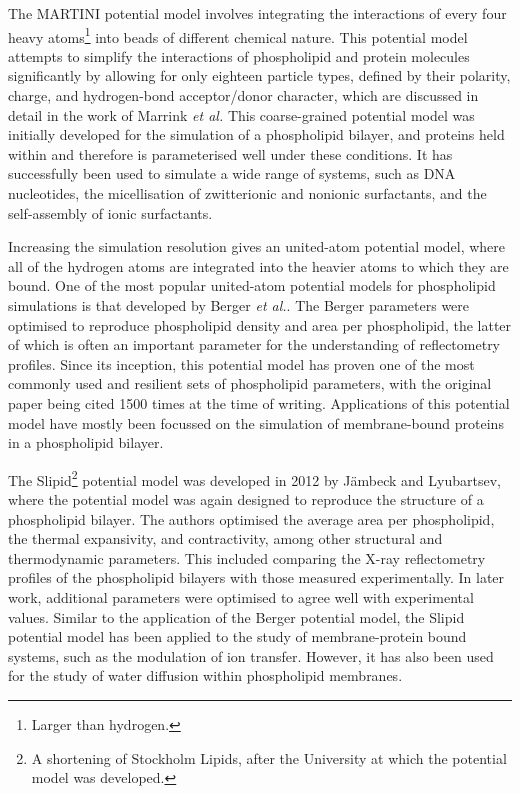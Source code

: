 The MARTINI potential model involves integrating the interactions of every four heavy atoms\footnote{Larger than hydrogen.} into beads of different chemical nature.
This potential model attempts to simplify the interactions of phospholipid and protein molecules significantly by allowing for only eighteen particle types, defined by their polarity, charge, and hydrogen-bond acceptor/donor character, which are discussed in detail in the work of Marrink \emph{et al.}\autocite{marrink_martini_2007}
This coarse-grained potential model was initially developed for the simulation of a phospholipid bilayer, and proteins held within and therefore is parameterised well under these conditions.
It has successfully been used to simulate a wide range of systems, such as DNA nucleotides,\autocite{uusitalo_martini_2015} the micellisation of zwitterionic and nonionic surfactants,\autocite{sanders_micellization_2010} and the self-assembly of ionic surfactants.\autocite{wang_coarse-grained_2015}

Increasing the simulation resolution gives an united-atom potential model, where all of the hydrogen atoms are integrated into the heavier atoms to which they are bound.
One of the most popular united-atom potential models for phospholipid simulations is that developed by Berger \emph{et al.}.\autocite{berger_molecular_1997}
The Berger parameters were optimised to reproduce phospholipid density and area per phospholipid, the latter of which is often an important parameter for the understanding of reflectometry profiles.
Since its inception, this potential model has proven one of the most commonly used and resilient sets of phospholipid parameters, with the original paper being cited 1500 times at the time of writing.
Applications of this potential model have mostly been focussed on the simulation of membrane-bound proteins in a phospholipid bilayer.\autocite{tieleman_membrane_2006,cordomi_membrane_2012}

The Slipid\footnote{A shortening of Stockholm Lipids, after the University at which the potential model was developed.} potential model was developed in 2012 by J\"{a}mbeck and Lyubartsev,\autocite{jambeck_derivation_2012} where the potential model was again designed to reproduce the structure of a phospholipid bilayer.
The authors optimised the average area per phospholipid, the thermal expansivity, and contractivity, among other structural and thermodynamic parameters.
This included comparing the X-ray reflectometry profiles of the phospholipid bilayers with those measured experimentally.
In later work, additional parameters were optimised to agree well with experimental values.\autocite{jambeck_extension_2012,jambeck_another_2013}
Similar to the application of the Berger potential model, the Slipid potential model has been applied to the study of membrane-protein bound systems, such as the modulation of ion transfer.\autocite{segala_controlling_2016}
However, it has also been used for the study of water diffusion within phospholipid membranes.\autocite{von_hansen_anomalous_2013}


